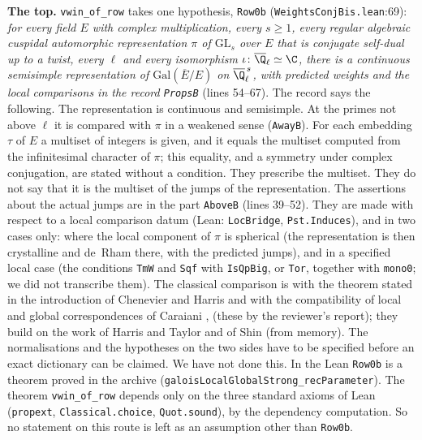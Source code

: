 \documentclass[11pt,letterpaper]{article}
\begin{document}
\textbf{The top.} \texttt{vwin\_of\_row} takes one hypothesis, \texttt{Row0b}
(\texttt{WeightsConjBis.lean}:69): \emph{for every field $E$
with complex multiplication, every $s\ge1$, every regular algebraic cuspidal automorphic representation
$\pi$ of $\mathrm{GL}_s$ over $E$ that is conjugate self-dual up to a twist, every $\ell$ and every
isomorphism $\iota\colon\overline{\Q}_\ell\simeq\C$, there is a
continuous semisimple representation of $\mathrm{Gal}(\overline E/E)$ on $\overline{\Q}_\ell^{\,s}$, with
predicted weights and the local comparisons in the record \texttt{PropsB}} (lines 54--67). The record says
the following. The representation is continuous and semisimple. At the primes not above $\ell$ it is
compared with $\pi$ in a weakened sense (\texttt{AwayB}). For each embedding $\tau$ of $E$ a multiset of
integers is given, and it equals the multiset computed from the infinitesimal character of $\pi$; this
equality, and a symmetry under complex conjugation, are stated without a condition. They prescribe the
multiset. They do not say that it is the multiset of the jumps of the representation. The assertions about
the actual jumps are in the part \texttt{AboveB} (lines 39--52). They are made with respect to a local
comparison datum (Lean: \texttt{LocBridge}, \texttt{Pst.Induces}), and in two cases only: where the local
component of $\pi$ is spherical (the representation is then crystalline and de~Rham there, with the predicted
jumps), and in a specified local case (the conditions \texttt{TmW} and \texttt{Sqf} with \texttt{IsQpBig},
or \texttt{Tor}, together with \texttt{mono0}; we did not transcribe them). The classical comparison is
with the theorem stated in the introduction of Chenevier and Harris \cite{CH13} and with the compatibility of
local and global correspondences of Caraiani \cite{Car12}, \cite[Thm.~1.1]{Car14} (these by the reviewer's
report); they build on the work of Harris and Taylor and of Shin (from memory). The normalisations and the hypotheses on the two sides have to
be specified before an exact dictionary can be claimed. We have not done this. In the Lean \texttt{Row0b} is
a theorem proved in the archive
(\texttt{galoisLocalGlobalStrong\_}\allowbreak\texttt{recParameter}). The theorem \texttt{vwin\_of\_row}
depends only on the three standard axioms of Lean (\texttt{propext}, \texttt{Classical.choice},
\texttt{Quot.sound}), by the dependency computation. So no statement on this route is left as an assumption
other than \texttt{Row0b}.
\end{document}
